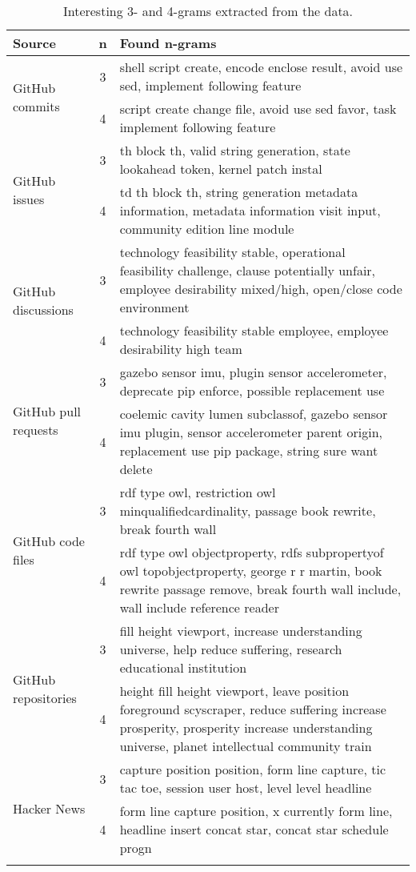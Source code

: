 \begin{longtable}{|l|c|m{8cm}|}
    \hline
    Source & n & Found n-grams  \\
    \hline
        \multirow{2}{*}{GitHub commits} & 3 & shell script create, encode enclose result, avoid use sed, implement following feature  \\
        \cline{2-3}
        & 4 & script create change file, avoid use sed favor, task implement following feature \\
    \hline
        \multirow{2}{*}{GitHub issues} & 3 & th block th, valid string generation, state lookahead token, kernel patch instal \\
        \cline{2-3}
        & 4 & td th block th, string generation metadata information, metadata information visit input, community edition line module \\
    \hline
        \multirow{2}{*}{GitHub discussions} & 3 & technology feasibility stable, operational feasibility challenge, clause potentially unfair, employee desirability mixed/high, open/close code environment \\
        \cline{2-3}
        & 4 & technology feasibility stable employee, employee desirability high team \\
    \hline
        \multirow{2}{*}{GitHub pull requests} & 3 & gazebo sensor imu, plugin sensor accelerometer, deprecate pip enforce, possible replacement use  \\
        \cline{2-3}
        & 4 & coelemic cavity lumen subclassof, gazebo sensor imu plugin, sensor accelerometer parent origin, replacement use pip package, string sure want delete \\
    \hline
        \multirow{2}{*}{GitHub code files} & 3 & rdf type owl, restriction owl minqualifiedcardinality, passage book rewrite, break fourth wall\\
        \cline{2-3}
        & 4 & rdf type owl objectproperty, rdfs subpropertyof owl topobjectproperty, george r r martin, book rewrite passage remove, break fourth wall include, wall include reference reader \\
    \hline
        \multirow{2}{*}{GitHub repositories} & 3 & fill height viewport, increase understanding universe, help reduce suffering, research educational institution \\
        \cline{2-3}
        & 4 & height fill height viewport, leave position foreground scyscraper, reduce suffering increase prosperity, prosperity increase understanding universe, planet intellectual community train \\
    \hline
        \multirow{2}{*}{Hacker News} & 3 & capture position position, form line capture, tic tac toe, session user host, level level headline \\
        \cline{2-3}
        & 4 & form line capture position, x currently form line, headline insert concat star, concat star schedule progn \\
    \hline
\caption{Interesting 3- and 4-grams extracted from the data.}
\label{table:common-ngrams}
\end{longtable}


